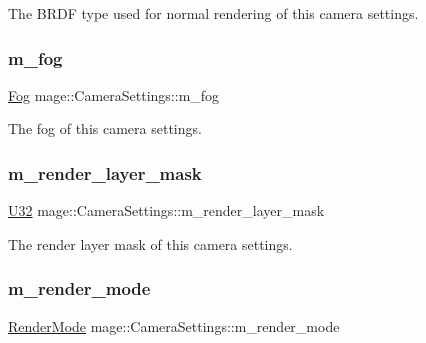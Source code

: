 The B\+R\+DF type used for normal rendering of this camera settings. \hypertarget{classmage_1_1_camera_settings_aef4d9aa95d6fe74fc241edab6de8bd3f}{}\label{classmage_1_1_camera_settings_aef4d9aa95d6fe74fc241edab6de8bd3f} 
\subsubsection{\texorpdfstring{m\+\_\+fog}{m\_fog}}
{\footnotesize\ttfamily \hyperlink{classmage_1_1_fog}{Fog} mage\+::\+Camera\+Settings\+::m\+\_\+fog\hspace{0.3cm}{\ttfamily [private]}}

The fog of this camera settings. \hypertarget{classmage_1_1_camera_settings_ad27594c8dc755e0dd8ca55564a4dff8b}{}\label{classmage_1_1_camera_settings_ad27594c8dc755e0dd8ca55564a4dff8b} 
\subsubsection{\texorpdfstring{m\+\_\+render\+\_\+layer\+\_\+mask}{m\_render\_layer\_mask}}
{\footnotesize\ttfamily \hyperlink{namespacemage_a41c104c036fba3756a74e19f793eeaa1}{U32} mage\+::\+Camera\+Settings\+::m\+\_\+render\+\_\+layer\+\_\+mask\hspace{0.3cm}{\ttfamily [private]}}

The render layer mask of this camera settings. \hypertarget{classmage_1_1_camera_settings_aa4d5139b4e8668c58507ead30812c84b}{}\label{classmage_1_1_camera_settings_aa4d5139b4e8668c58507ead30812c84b} 
\subsubsection{\texorpdfstring{m\+\_\+render\+\_\+mode}{m\_render\_mode}}
{\footnotesize\ttfamily \hyperlink{namespacemage_a5e7e18b0154373ce8fc942fe3f6b27fd}{Render\+Mode} mage\+::\+Camera\+Settings\+::m\+\_\+render\+\_\+mode\hspace{0.3cm}{\ttfamily [private]}}

